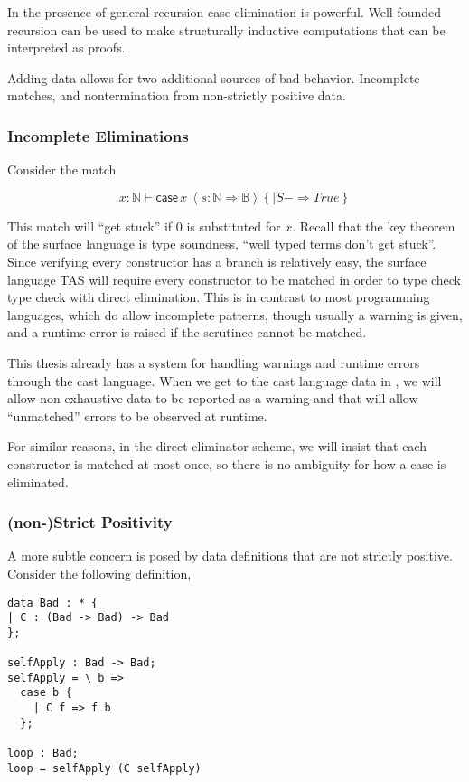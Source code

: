 In the presence of general recursion case elimination is powerful.
Well-founded recursion can be used to make structurally inductive computations that can be interpreted as proofs..

Adding data allows for two additional sources of bad behavior.
Incomplete matches, and nontermination from non-strictly positive data. 

\subsubsection{Incomplete Eliminations}

Consider the match 

\[
x:\mathbb{N}\vdash\mathsf{case}\,x\,\left\langle s:\mathbb{N}\Rightarrow\mathbb{B}\right\rangle \left\{ |S-\Rightarrow True\right\} 
\]

This match will ``get stuck'' if $0$ is substituted for $x$.
Recall that the key theorem of the surface language is type soundness, ``well typed terms don't get stuck''.
Since verifying every constructor has a branch is relatively easy, the surface language \ac{TAS} will require every constructor to be matched in order to type check type check with direct elimination.
This is in contrast to most programming languages, which do allow incomplete patterns, though usually a warning is given, and a runtime error is raised if the scrutinee cannot be matched.


This thesis already has a system for handling warnings and runtime errors through the cast language.
When we get to the cast language data in , we will allow non-exhaustive data to be reported as a warning and that will allow ``unmatched'' errors to be observed at runtime.

For similar reasons, in the direct eliminator scheme, we will insist that each constructor is matched at most once, so there is no ambiguity for how a case is eliminated.

\subsubsection{(non-)Strict Positivity}

A more subtle concern is posed by data definitions that are not strictly positive.
Consider the following definition, 

\begin{lstlisting}[basicstyle={\ttfamily\small}]
data Bad : * {
| C : (Bad -> Bad) -> Bad
};

selfApply : Bad -> Bad;
selfApply = \ b =>
  case b {
    | C f => f b
  };

loop : Bad;
loop = selfApply (C selfApply)
\end{lstlisting}


